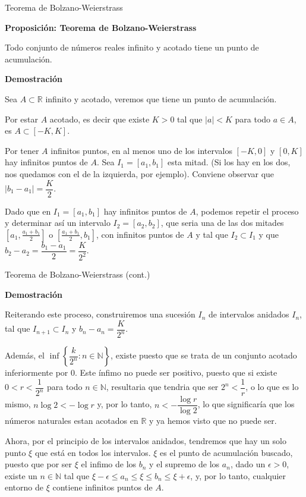 \documentclass[ignorenonframetext,]{beamer}
\begin{document}
\begin{frame}{Teorema de Bolzano-Weierstrass}
\protect\hypertarget{teorema-de-bolzano-weierstrass}{}

 \textbf{Proposición: Teorema de Bolzano-Weierstrass}

Todo conjunto de números reales infinito y acotado tiene un punto de
acumulación.

\textbf{Demostración}

Sea \(A\subset \mathbb{R}\) infinito y acotado, veremos que tiene un
punto de acumulación.

Por estar \(A\) acotado, es decir que existe \(K>0\) tal que \(|a|<K\)
para todo \(a \in A\), es \(A \subset [-K,K]\).

Por tener \(A\) infinitos puntos, en al menos uno de los intervalos
\([-K,0]\) y \([0,K]\) hay infinitos puntos de \(A\). Sea
\(I_1 =[a_1,b_1]\) esta mitad. (Si los hay en los dos, nos quedamos con
el de la izquierda, por ejemplo). Conviene observar que
\(|b_1-a_1|=\dfrac{K}{2}\).

Dado que en \(I_1 =[a_1,b_1]\) hay infinitos puntos de \(A\), podemos
repetir el proceso y determinar así un intervalo \(I_2 = [a_2,b_2]\),
que seria una de las dos mitades \([a_1, \frac{a_1+b_1}{2}]\) o
\([\frac{a_1+b_1}{2},b_1]\), con infinitos puntos de \(A\) y tal que
\(I_2 \subset I_1\) y que
\(b_2-a_2= \dfrac{b_1 - a_1}{2}= \dfrac{K}{2^2}\).

\end{frame}

\begin{frame}{Teorema de Bolzano-Weierstrass (cont.)}
\protect\hypertarget{teorema-de-bolzano-weierstrass-cont.}{}

\textbf{Demostración}

Reiterando este proceso, construiremos una sucesión \(I_n\) de
intervalos anidados \(I_n\), tal que \(I_{n+1} \subset I_n\) y
\(b_n-a_n = \dfrac{K}{2^n}\).

Además, el \(\inf \left\{\dfrac{k}{2^n}: n \in \mathbb{N} \right\}\),
existe puesto que se trata de un conjunto acotado inferiormente por
\(0\). Este ínfimo no puede ser positivo, puesto que si existe
\(0 < r <\dfrac{1}{2^n}\) para todo \(n \in \mathbb{N}\), resultaria que
tendria que ser \(2^n < \dfrac{1}{r}\), o lo que es lo mismo,
\(n \log 2 <-\log r\) y, por lo tanto, \(n < -\dfrac{\log r}{\log 2}\),
lo que significaría que los números naturales estan acotados en
\(\mathbb{R}\) y ya hemos visto que no puede ser.

Ahora, por el principio de los intervalos anidados, tendremos que hay un
solo punto \(\xi\) que está en todos los intervalos. \(\xi\) es el punto
de acumulación buscado, puesto que por ser \(\xi\) el infimo de los
\(b_n\) y el supremo de los \(a_n\), dado un \(\epsilon >0\), existe un
\(n \in \mathbb{N}\) tal que
\(\xi-\epsilon \leq a_n \leq \xi \leq b_n \leq \xi+ \epsilon\), y, por
lo tanto, cualquier entorno de \(\xi\) contiene infinitos puntos de
\(A\).

\end{frame}
\end{document}
